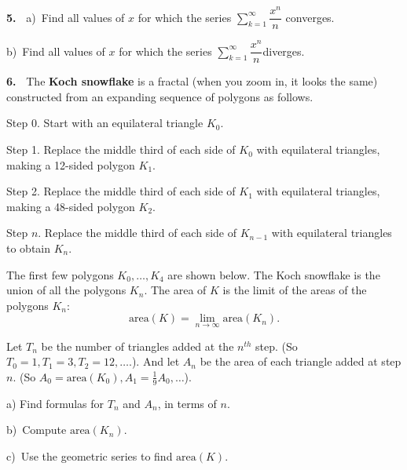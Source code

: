 \documentclass[12pt]{article}
\theoremstyle{definition}
\theoremstyle{remark}
\theoremstyle{definition}
\begin{document}
{\bf 5.\ }
a)\ Find all values of $x$ for which the series $\sum\limits_{k=1}^\infty\dfrac{x^n}{n}$ converges.

b)\ Find all values of $x$ for which the series $\sum\limits_{k=1}^\infty\dfrac{x^n}{n}$diverges.




\newpage
{\bf 6.\ } The {\bf Koch snowflake} is a fractal (when you zoom in, it looks the same) constructed from an expanding sequence of polygons  as follows. 

Step 0. Start with an equilateral triangle $K_0$. 

Step 1. Replace the middle third of each side of $K_0$ with equilateral triangles, making a 12-sided polygon $K_1$.

Step 2. Replace the middle third of each side of $K_1$ with equilateral triangles, making a 48-sided polygon $K_2$. 

Step $n$. Replace the middle third of each side of $K_{n-1}$ with equilateral triangles to obtain $K_n$. 

The first few polygons $K_0,\dots, K_4$ are shown below. The Koch snowflake is the union of all the polygons $K_n$. The area of $K$ is the limit of the areas of the polygons $K_n$:
\[\text{area}(K)=\lim_{n\to\infty}\text{area}(K_n).\]

\quad
{}\quad
{}\quad
{}\quad
{}\quad
Let $T_n$ be the number of triangles added at the $n^{th}$ step. (So $T_0=1, T_1=3, T_2=12,\dots$.). And let $A_n$ be the  area of each triangle added at step $n$. (So $A_0=\text{area}(K_0), A_1=\frac{1}{9}A_0,\dots$). 

a) Find formulas for $T_n$ and $A_n$, in terms of $n$. 

b)\ Compute $\text{area}(K_n)$. 

c)\ Use the geometric series to find $\text{area}(K)$. 
\end{document}
